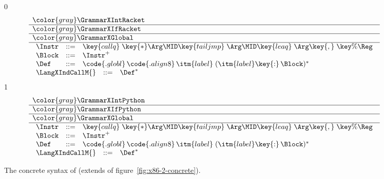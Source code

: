\documentclass[7x10]{TimesAPriori_MIT}%
\newcommand{\gray}[1]{{\color{gray} #1}}
\def\racketEd{0}
\def\pythonEd{1}
\def\edition{1}
\numberwithin{theorem}{chapter}
\numberwithin{definition}{chapter}
\numberwithin{equation}{chapter}
\begin{document}
\newcommand{\GrammarXIndCall}{
\begin{array}{lcl}
\Instr &::=&  \key{callq}\;\key{*}\Arg \MID \key{tailjmp}\;\Arg 
     \MID \key{leaq}\;\Arg\key{,}\;\key{\%}\Reg \\
\Block &::= & \Instr^{+} \\
\Def &::= & \code{.globl}\,\code{.align 8}\,\itm{label}\; (\itm{label}\key{:}\, \Block)^{*} 
\end{array}
}

\newcommand{\ASTXIndCallRacket}{
\begin{array}{lcl}
  \Instr &::=& \INDCALLQ{\Arg}{\itm{int}}
    \MID \TAILJMP{\Arg}{\itm{int}}\\
    &\MID& \BININSTR{\code{'leaq}}{\Arg}{\REG{\Reg}}\\
  \Block &::= & \BLOCK{\itm{info}}{\LP\Instr\ldots\RP}\\
  \Def &::= & \DEF{\itm{label}}{\code{'()}}{\Type}{\itm{info}}{\LP\LP\itm{label}\,\key{.}\,\Block\RP\ldots\RP} 
\end{array}
}

\begin{figure}[tp]
  \begin{tcolorbox}[colback=white]
\small
{\if\edition\racketEd
\[
\begin{array}{l}
  \gray{\GrammarXIntRacket} \\ \hline
  \gray{\GrammarXIfRacket} \\ \hline
  \gray{\GrammarXGlobal} \\ \hline
  \GrammarXIndCall \\
\begin{array}{lcl}
\LangXIndCallM{} &::= & \Def^{*}
\end{array}
\end{array}
\]
\fi}
{\if\edition\pythonEd
\[
\begin{array}{l}
  \gray{\GrammarXIntPython} \\ \hline
  \gray{\GrammarXIfPython} \\ \hline
  \gray{\GrammarXGlobal} \\ \hline
  \GrammarXIndCall \\
\begin{array}{lcl}
\LangXIndCallM{} &::= & \Def^{*}
\end{array}
\end{array}
\]
\fi}
  \end{tcolorbox}

\caption{The concrete syntax of \LangXIndCall{} (extends \LangXGlobal{} of figure~\ref{fig:x86-2-concrete}).}
\label{fig:x86-3-concrete}
\end{figure}
\end{document}
